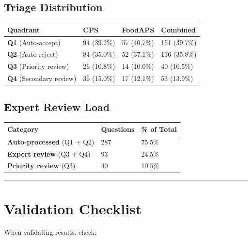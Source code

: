 \documentclass[
  letterpaper,
]{report}
\begin{document}
\subsection{Triage Distribution}\label{triage-distribution}

\begin{longtable}[]{@{}llll@{}}
\toprule\noalign{}
Quadrant & CPS & FoodAPS & Combined \\
\midrule\noalign{}
\endhead
\bottomrule\noalign{}
\endlastfoot
\textbf{Q1} (Auto-accept) & 94 (39.2\%) & 57 (40.7\%) & 151 (39.7\%) \\
\textbf{Q2} (Auto-reject) & 84 (35.0\%) & 52 (37.1\%) & 136 (35.8\%) \\
\textbf{Q3} (Priority review) & 26 (10.8\%) & 14 (10.0\%) & 40
(10.5\%) \\
\textbf{Q4} (Secondary review) & 36 (15.0\%) & 17 (12.1\%) & 53
(13.9\%) \\
\end{longtable}

\subsection{Expert Review Load}\label{expert-review-load-1}

\begin{longtable}[]{@{}lll@{}}
\toprule\noalign{}
Category & Questions & \% of Total \\
\midrule\noalign{}
\endhead
\bottomrule\noalign{}
\endlastfoot
\textbf{Auto-processed} (Q1 + Q2) & 287 & 75.5\% \\
\textbf{Expert review} (Q3 + Q4) & 93 & 24.5\% \\
\textbf{Priority review} (Q3) & 40 & 10.5\% \\
\end{longtable}

\begin{center}\rule{0.5\linewidth}{0.5pt}\end{center}

\section{Validation Checklist}\label{validation-checklist}

When validating results, check:
\end{document}
